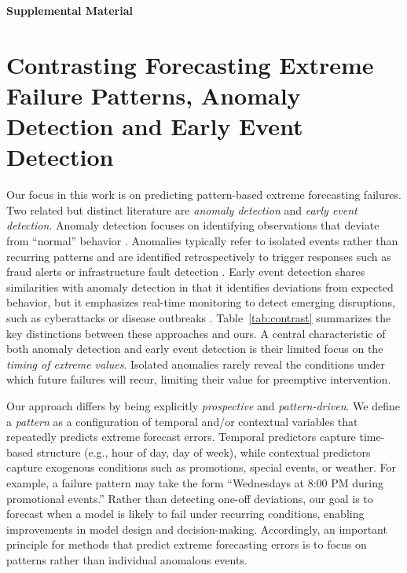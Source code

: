 \documentclass[12pt]{article}
\begin{document}
\clearpage
\bigskip
\begin{center}
{\large\bf Supplemental Material}
\end{center}
\FloatBarrier

\section{Contrasting Forecasting Extreme Failure Patterns, Anomaly Detection and Early Event Detection}
\label{sec-contrasting}
Our focus in this work is on predicting pattern-based extreme forecasting failures.
Two related but distinct literature are \emph{anomaly detection} and \emph{early event detection}. Anomaly detection focuses on identifying observations that deviate from ``normal'' behavior \citep{chandola2009, nassif2021}. Anomalies typically refer to isolated events rather than recurring patterns and are identified retrospectively to trigger responses such as fraud alerts or infrastructure fault detection \citep{patcha2007, akouemo2016}.
Early event detection shares similarities with anomaly detection in that it identifies deviations from expected behavior, but it emphasizes real-time monitoring to detect emerging disruptions, such as cyberattacks or disease outbreaks \citep{wang2021, deljac2015, shmueli2010}. Table~\ref{tab:contrast} summarizes the key distinctions between these approaches and ours. A central characteristic %
of both anomaly detection and early event detection is their limited focus on the \emph{timing of extreme %
values}. Isolated anomalies rarely reveal the conditions under which future failures will recur, limiting their value for preemptive intervention.

Our approach differs by being explicitly \emph{prospective} and \emph{pattern-driven}. We define a \emph{pattern} as a configuration of temporal and/or contextual variables that repeatedly predicts extreme forecast errors. Temporal predictors capture time-based structure (e.g., hour of day, day of week), while contextual predictors capture exogenous conditions such as promotions, special events, or weather. For example, a failure pattern may take the form “Wednesdays at 8:00 PM during promotional events.” Rather than detecting one-off deviations, our goal is to forecast when a model is likely to fail under recurring conditions, enabling improvements in model design and decision-making. Accordingly, an important principle for methods that predict extreme forecasting errors is to focus on patterns rather than individual anomalous events.
\end{document}
